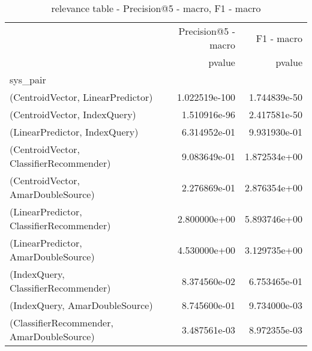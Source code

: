 \documentclass[11pt]{article}
\begin{document}
\begin{table}[H]
\centering
\caption{relevance table - Precision@5 - macro, F1 - macro}
\begin{tabular}{lrr}
\toprule
{} & Precision@5 - macro &    F1 - macro \\
{} &              pvalue &        pvalue \\
sys\_pair                                  &                     &               \\
\midrule
(CentroidVector, LinearPredictor)         &       1.022519e-100 &  1.744839e-50 \\
(CentroidVector, IndexQuery)              &        1.510916e-96 &  2.417581e-50 \\
(LinearPredictor, IndexQuery)             &        6.314952e-01 &  9.931930e-01 \\
(CentroidVector, ClassifierRecommender)   &        9.083649e-01 &  1.872534e+00 \\
(CentroidVector, AmarDoubleSource)        &        2.276869e-01 &  2.876354e+00 \\
(LinearPredictor, ClassifierRecommender)  &        2.800000e+00 &  5.893746e+00 \\
(LinearPredictor, AmarDoubleSource)       &        4.530000e+00 &  3.129735e+00 \\
(IndexQuery, ClassifierRecommender)       &        8.374560e-02 &  6.753465e-01 \\
(IndexQuery, AmarDoubleSource)            &        8.745600e-01 &  9.734000e-03 \\
(ClassifierRecommender, AmarDoubleSource) &        3.487561e-03 &  8.972355e-03 \\
\bottomrule
\end{tabular}
\end{table}
\end{document}
